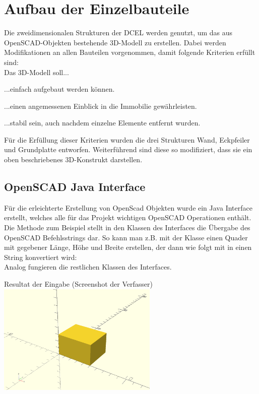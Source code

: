 \section{Aufbau der Einzelbauteile}
Die zweidimensionalen Strukturen der DCEL werden genutzt, um das aus OpenSCAD-Objekten bestehende 3D-Modell zu erstellen.
Dabei werden Modifikationen an allen Bauteilen vorgenommen, damit folgende Kriterien erfüllt sind:\\
Das 3D-Modell soll...

\begin{compactenum}
	\item ...einfach aufgebaut werden können.
	\item ...einen angemessenen Einblick in die Immobilie gewährleisten.
	\item ...stabil sein, auch nachdem einzelne Elemente entfernt wurden.
\end{compactenum}

Für die Erfüllung dieser Kriterien wurden die drei Strukturen Wand, Eckpfeiler und Grundplatte entworfen.
Weiterführend sind diese so modifiziert, dass sie ein oben beschriebenes 3D-Konstrukt darstellen.

\subsection{OpenSCAD Java Interface}
Für die erleichterte Erstellung von OpenScad Objekten wurde ein Java Interface  erstellt, welches alle für das Projekt wichtigen OpenSCAD Operationen enthält.
Die Methode  zum Beispiel stellt in den Klassen des Interfaces die Übergabe des OpenSCAD Befehlsstrings dar.
So kann man z.B. mit der Klasse  einen Quader mit gegebener Länge, Höhe und Breite erstellen, der dann wie folgt mit  in einen String konvertiert wird:
\\
Analog fungieren die restlichen Klassen des Interfaces.

\begin{Bild}{Resultat der Eingabe  (Screenshot der Verfasser)}
	\includegraphics[height = 200px]{Bilder/Quader}
\end{Bild}

